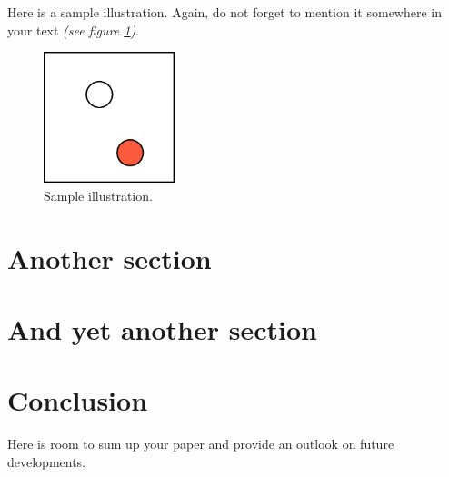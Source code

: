 \documentclass[journal]{vgtc}                %
\begin{document}
Here is a sample illustration. Again, do not forget to mention it somewhere in your text \textit{(see figure \ref{fig:sampleimage})}.
\begin{figure}[htb]
  \centering
  \includegraphics[width=1.5in]{sample}
  \caption{Sample illustration.}
  \label{fig:sampleimage}
\end{figure}

 
\section{Another section}

\section{And yet another section}


\section{Conclusion}

Here is room to sum up your paper and provide an outlook on future developments.

%
\printbibliography
\end{document}
